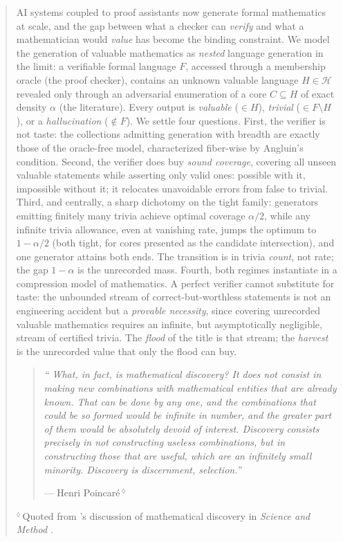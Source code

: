 \documentclass[11pt]{article}
\numberwithin{equation}{section}
\newcommand{\mc}[1]{\mathcal{#1}}
\newcommand{\Amb}{F}
\newcommand{\Val}{H}
\newcommand{\Hcal}{\mc{H}}
\newcommand{\Core}{C}
\theoremstyle{plain}
\theoremstyle{definition}
\theoremstyle{remark}
\begin{document}
\begin{abstract}
\small\linespread{1.0}\selectfont
AI systems coupled to proof assistants now generate formal mathematics at scale, and the gap
between what a checker can \emph{verify} and what a mathematician would \emph{value} has
become the binding constraint. We model the generation of valuable mathematics as
\emph{nested} language generation in the limit: a verifiable formal language $\Amb$, accessed
through a membership oracle (the proof checker), contains an unknown valuable language
$\Val\in\Hcal$ revealed only through an adversarial enumeration of a core $\Core\subseteq\Val$
of exact density $\alpha$ (the literature). Every output is \emph{valuable} ($\in\Val$),
\emph{trivial} ($\in\Amb\setminus\Val$), or a \emph{hallucination} ($\notin\Amb$). We settle
four questions. First, the verifier is not taste: the collections admitting generation with
breadth are exactly those of the oracle-free model, characterized fiber-wise by Angluin's
condition. Second, the verifier does buy \emph{sound coverage}, covering all unseen valuable
statements while asserting only valid ones: possible with it, impossible without it; it
relocates unavoidable errors from false to trivial. Third, and centrally, a sharp dichotomy on
the tight family: generators emitting finitely many trivia achieve optimal coverage
$\alpha/2$, while any infinite trivia allowance, even at vanishing rate, jumps the optimum to
$1-\alpha/2$ (both tight, for cores presented as the candidate intersection), and one
generator attains both ends. The transition is in trivia \emph{count}, not rate; the gap
$1-\alpha$ is the unrecorded mass. Fourth, both regimes instantiate in a compression model of
mathematics. A perfect verifier cannot substitute for taste: the unbounded stream of
correct-but-worthless statements is not an engineering accident but a \emph{provable
necessity}, since covering unrecorded valuable mathematics requires an infinite, but
asymptotically negligible, stream of certified trivia. The \emph{flood} of the title is that
stream; the \emph{harvest} is the unrecorded value that only the flood can buy.
\vspace{3mm}
\begin{poincarebox}
\begin{quote}
\itshape
``
What, in fact, is mathematical discovery? It does not consist in making new combinations with mathematical entities that are already known. That can be done by any one, and the combinations that could be so formed would be infinite in number, and the
greater part of them would be absolutely devoid of interest. 
Discovery consists precisely in not constructing useless combinations, but in constructing those that are useful, which are an infinitely small minority. Discovery is discernment, selection.''

\hfill --- Henri Poincaré\,$^\lozenge$

\end{quote}
\end{poincarebox}
\nopagebreak
{\footnotesize\color{inkgray}\hfill $^\lozenge$\,Quoted from \citeauthor{poincare1914science}'s discussion of mathematical discovery in \emph{Science and Method} \citeyearpar{poincare1914science}.\par}
\end{abstract}
\tableofcontents
\newpage
\end{document}

